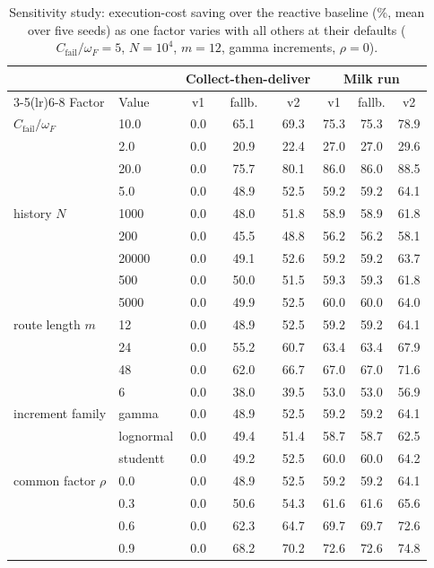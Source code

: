 \begin{table}[t]
\caption{Sensitivity study: execution-cost saving over the reactive
baseline (\%, mean over five seeds) as one factor varies with all others
at their defaults ($C_{\mathrm{fail}}/\omega_F{=}5$, $N{=}10^4$,
$m{=}12$, gamma increments, $\rho{=}0$).}
\label{tab:sensitivity}
\centering
\setlength{\tabcolsep}{4pt}
\begin{tabular}{ll ccc ccc}
\toprule
& & \multicolumn{3}{c}{Collect-then-deliver} &
\multicolumn{3}{c}{Milk run} \\
\cmidrule(lr){3-5}\cmidrule(lr){6-8}
Factor & Value & v1 & fallb. & v2 & v1 & fallb. & v2 \\
\midrule
$C_{\mathrm{fail}}/\omega_F$ & 10.0 & 0.0 & 65.1 & 69.3 & 75.3 & 75.3 & 78.9 \\
 & 2.0 & 0.0 & 20.9 & 22.4 & 27.0 & 27.0 & 29.6 \\
 & 20.0 & 0.0 & 75.7 & 80.1 & 86.0 & 86.0 & 88.5 \\
 & 5.0 & 0.0 & 48.9 & 52.5 & 59.2 & 59.2 & 64.1 \\
\addlinespace
history $N$ & 1000 & 0.0 & 48.0 & 51.8 & 58.9 & 58.9 & 61.8 \\
 & 200 & 0.0 & 45.5 & 48.8 & 56.2 & 56.2 & 58.1 \\
 & 20000 & 0.0 & 49.1 & 52.6 & 59.2 & 59.2 & 63.7 \\
 & 500 & 0.0 & 50.0 & 51.5 & 59.3 & 59.3 & 61.8 \\
 & 5000 & 0.0 & 49.9 & 52.5 & 60.0 & 60.0 & 64.0 \\
\addlinespace
route length $m$ & 12 & 0.0 & 48.9 & 52.5 & 59.2 & 59.2 & 64.1 \\
 & 24 & 0.0 & 55.2 & 60.7 & 63.4 & 63.4 & 67.9 \\
 & 48 & 0.0 & 62.0 & 66.7 & 67.0 & 67.0 & 71.6 \\
 & 6 & 0.0 & 38.0 & 39.5 & 53.0 & 53.0 & 56.9 \\
\addlinespace
increment family & gamma & 0.0 & 48.9 & 52.5 & 59.2 & 59.2 & 64.1 \\
 & lognormal & 0.0 & 49.4 & 51.4 & 58.7 & 58.7 & 62.5 \\
 & studentt & 0.0 & 49.2 & 52.5 & 60.0 & 60.0 & 64.2 \\
\addlinespace
common factor $\rho$ & 0.0 & 0.0 & 48.9 & 52.5 & 59.2 & 59.2 & 64.1 \\
 & 0.3 & 0.0 & 50.6 & 54.3 & 61.6 & 61.6 & 65.6 \\
 & 0.6 & 0.0 & 62.3 & 64.7 & 69.7 & 69.7 & 72.6 \\
 & 0.9 & 0.0 & 68.2 & 70.2 & 72.6 & 72.6 & 74.8 \\
\bottomrule
\end{tabular}
\end{table}
